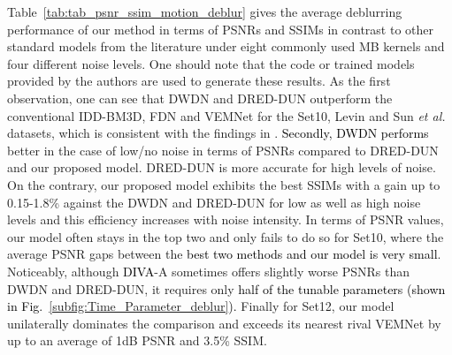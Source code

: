 \documentclass[10pt,journal,compsoc]{IEEEtran}
\newcommand{\sd}{\textcolor{black}}
\newcommand{\dk}{\textcolor{black}}
\begin{document}


Table~\ref{tab:tab_psnr_ssim_motion_deblur} gives the average deblurring performance of our method in terms of PSNRs and SSIMs in contrast to other standard models from the literature under eight commonly used MB kernels \cite{Levin2011efficient, Kong2022deep} and four different noise levels. One should note that the code or trained models provided by the authors are used to generate these results. As the first observation, one can see that DWDN and DRED-DUN outperform the conventional IDD-BM3D, FDN and VEMNet for the Set10, Levin and Sun \textit{et al.} datasets, which is consistent with the findings in \cite{Kong2022deep}. \sd{Secondly, DWDN performs} better in the case of low/no noise in terms of PSNRs compared to DRED-DUN and our proposed model. DRED-DUN is more accurate for high levels of noise. On the contrary, our proposed model exhibits the best SSIMs with a gain up to 0.15-1.8\% against the DWDN and DRED-DUN for low as well as high noise levels and this efficiency increases with noise intensity. In terms of PSNR values, our model often stays in the top two and only fails to do so for Set10, where the average PSNR gaps between the \sd{best two methods and our model is very small}. Noticeably, although \dk{DIVA}-A sometimes offers slightly worse PSNRs than DWDN and DRED-DUN, it requires only \sd{half of the tunable parameters (shown in Fig.~\ref{subfig:Time_Parameter_deblur}).}
Finally for Set12, our model unilaterally dominates the comparison and exceeds its nearest rival VEMNet by up to an average of 1dB PSNR and 3.5\% SSIM. %
\end{document}
